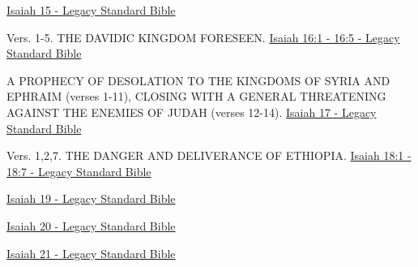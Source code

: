 \documentclass[
  ignorenonframetext,
]{beamer}
\begin{document}
\begin{frame}{15}
\label{section-45}
\href{https://read.lsbible.org/?q=is15}{Isaiah 15 - Legacy Standard
Bible}
\end{frame}

\begin{frame}{16}
\label{section-46}
\begin{block}{Vers. 1-5. THE DAVIDIC KINGDOM FORESEEN.}
\label{vers.-1-5.-the-davidic-kingdom-foreseen.}
\href{https://read.lsbible.org/?q=is16\%3A1-5}{Isaiah 16:1 - 16:5 -
Legacy Standard Bible}
\end{block}
\end{frame}

\begin{frame}{17}
\label{section-47}
\begin{block}{A PROPHECY OF DESOLATION TO THE KINGDOMS OF SYRIA AND
EPHRAIM (verses 1-11), CLOSING WITH A GENERAL THREATENING AGAINST THE
ENEMIES OF JUDAH (verses 12-14).}
\label{a-prophecy-of-desolation-to-the-kingdoms-of-syria-and-ephraim-verses-1-11-closing-with-a-general-threatening-against-the-enemies-of-judah-verses-12-14.}
\href{https://read.lsbible.org/?q=is17}{Isaiah 17 - Legacy Standard
Bible}
\end{block}
\end{frame}

\begin{frame}{18}
\label{section-48}
\begin{block}{Vers. 1,2,7. THE DANGER AND DELIVERANCE OF ETHIOPIA.}
\label{vers.-127.-the-danger-and-deliverance-of-ethiopia.}
\href{https://read.lsbible.org/?q=is18\%3A1-7}{Isaiah 18:1 - 18:7 -
Legacy Standard Bible}
\end{block}
\end{frame}

\begin{frame}{19}
\label{section-49}
\href{https://read.lsbible.org/?q=is19}{Isaiah 19 - Legacy Standard
Bible}
\end{frame}

\begin{frame}{20}
\label{section-50}
\href{https://read.lsbible.org/?q=is20}{Isaiah 20 - Legacy Standard
Bible}
\end{frame}

\begin{frame}{21}
\label{section-51}
\href{https://read.lsbible.org/?q=is21}{Isaiah 21 - Legacy Standard
Bible}
\end{frame}
\end{document}

